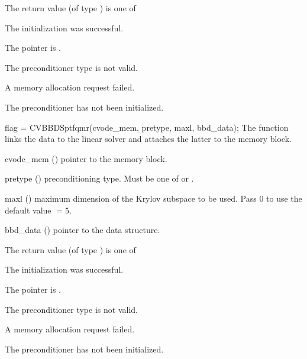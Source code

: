 {
  The return value  (of type ) is one of
  \begin{args}
  \item[\Id{CVSPILS\_SUCCESS}] 
    The {\cvspbcg} initialization was successful.
  \item[\Id{CVSPILS\_MEM\_NULL}]
    The  pointer is .
  \item[\Id{CVSPILS\_ILL\_INPUT}]
    The preconditioner type  is not valid.
  \item[\Id{CVSPILS\_MEM\_FAIL}]
    A memory allocation request failed.
  \item[\Id{CVBBDPRE\_PDATA\_NULL}]
    The {\cvbbdpre} preconditioner has not been initialized.
  \end{args}
}
{}
{
  flag = CVBBDSptfqmr(cvode\_mem, pretype, maxl, bbd\_data);
}
{
  The function  links the {\cvbbdpre} data to the
  {\cvsptfqmr} linear solver and attaches the latter to the {\cvode}
  memory block.
}
{
  \begin{args}
  \item[cvode\_mem] ()
    pointer to the {\cvode} memory block.
  \item[pretype] ()
    preconditioning type. Must be one of  or .
  \item[maxl] ()
    maximum dimension of the Krylov subspace to be used. Pass $0$ to use the 
    default value  $= 5$.
  \item[bbd\_data] ()
    pointer to the {\cvbbdpre} data structure.
  \end{args}
}
{
  The return value  (of type ) is one of
  \begin{args}
  \item[\Id{CVSPILS\_SUCCESS}] 
    The {\cvsptfqmr} initialization was successful.
  \item[\Id{CVSPILS\_MEM\_NULL}]
    The  pointer is .
  \item[\Id{CVSPILS\_ILL\_INPUT}]
    The preconditioner type  is not valid.
  \item[\Id{CVSPILS\_MEM\_FAIL}]
    A memory allocation request failed.
  \item[\Id{CVBBDPRE\_PDATA\_NULL}]
    The {\cvbbdpre} preconditioner has not been initialized.
  \end{args}
}
